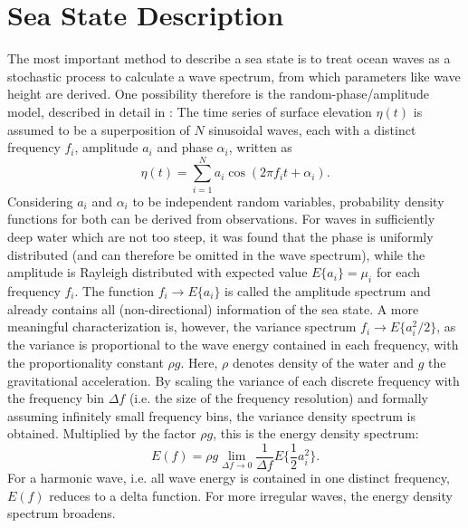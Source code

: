\section{Sea State Description}
The most important method 
to describe a sea state is to treat ocean waves as a stochastic process to 
calculate a wave spectrum, from which parameters like wave height are derived. 
One possibility therefore is the random-phase/amplitude model, described in 
detail in \cite{holthuijsen2007}: The time series of surface elevation $ \eta 
(t)$ is assumed to be a superposition of $N$ sinusoidal waves, each with a 
distinct frequency $f_i$, amplitude $a_i$ and phase $\alpha_i$, written as
\begin{equation}
 \label{sinussum}
 \eta(t) = \sum_{i=1}^N a_i \cos (2\pi f_i t + \alpha_i).
\end{equation}
Considering $a_i$ and $\alpha_i$ to be independent random variables, 
probability density functions for both can be derived from observations. For 
waves in sufficiently deep water which are not too steep, it was found that the 
phase is uniformly distributed (and can therefore be omitted in the wave 
spectrum), while the amplitude is Rayleigh distributed with expected value 
$E\{a_i\} = \mu_i$ for each frequency $f_i$. The function $f_i \rightarrow 
E\{a_i\}$ is called the amplitude spectrum and already contains all 
(non-directional) information of the sea state. A more meaningful 
characterization is, however, the variance spectrum $f_i \rightarrow E\{a_i^2 
\slash 2\}$, as the variance is proportional to the wave energy contained in 
each frequency, with the proportionality constant $\rho g$. Here, $\rho$ denotes 
density of the water and $g$ the gravitational acceleration. By scaling the 
variance of each discrete frequency with the frequency bin $\Delta f$ (i.e. the 
size of the frequency resolution) and formally assuming infinitely small 
frequency bins, the variance density spectrum is obtained. Multiplied by the 
factor $\rho g$, this is the energy density spectrum:
\begin{equation}
 \label{vardensspec}
 E(f) = \rho g \lim_{\Delta f \rightarrow 0} \frac{1}{\Delta f} E\{\frac{1}{2} 
a_i^2\}.
\end{equation}
For a harmonic wave, i.e. all wave energy is contained in one distinct 
frequency, $E(f)$ reduces to a delta function. For more irregular waves, the 
energy density spectrum broadens. 

